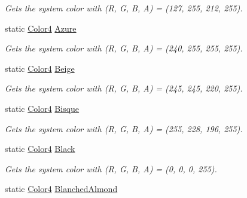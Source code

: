 \begin{DoxyCompactItemize}
\begin{DoxyCompactList}\small\item\em Gets the system color with (R, G, B, A) = (127, 255, 212, 255). \end{DoxyCompactList}\item 
static \hyperlink{struct_open_t_k_1_1_graphics_1_1_color4}{Color4} \hyperlink{struct_open_t_k_1_1_graphics_1_1_color4_ad21feb20ee214cb7a6368eafe6ca35f9}{Azure}
\begin{DoxyCompactList}\small\item\em Gets the system color with (R, G, B, A) = (240, 255, 255, 255). \end{DoxyCompactList}\item 
static \hyperlink{struct_open_t_k_1_1_graphics_1_1_color4}{Color4} \hyperlink{struct_open_t_k_1_1_graphics_1_1_color4_a60ff8610cd6eb9ff5782d054342bed5e}{Beige}
\begin{DoxyCompactList}\small\item\em Gets the system color with (R, G, B, A) = (245, 245, 220, 255). \end{DoxyCompactList}\item 
static \hyperlink{struct_open_t_k_1_1_graphics_1_1_color4}{Color4} \hyperlink{struct_open_t_k_1_1_graphics_1_1_color4_ac72ef1694a5b0128c2acdda2b92d3022}{Bisque}
\begin{DoxyCompactList}\small\item\em Gets the system color with (R, G, B, A) = (255, 228, 196, 255). \end{DoxyCompactList}\item 
static \hyperlink{struct_open_t_k_1_1_graphics_1_1_color4}{Color4} \hyperlink{struct_open_t_k_1_1_graphics_1_1_color4_a48fb74ebc3e66a4b6017f200f62b01a9}{Black}
\begin{DoxyCompactList}\small\item\em Gets the system color with (R, G, B, A) = (0, 0, 0, 255). \end{DoxyCompactList}\item 
static \hyperlink{struct_open_t_k_1_1_graphics_1_1_color4}{Color4} \hyperlink{struct_open_t_k_1_1_graphics_1_1_color4_aeaacaa1714eebce3bd224e2fb4f6e040}{Blanched\-Almond}

\end{DoxyCompactItemize}
